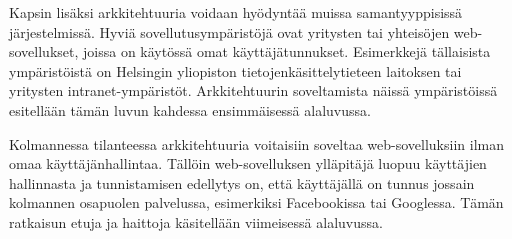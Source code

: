 Kapsin lisäksi arkkitehtuuria voidaan hyödyntää muissa samantyyppisissä järjestelmissä. Hyviä sovellutusympäristöjä ovat yritysten tai yhteisöjen web-sovellukset, joissa on käytössä omat käyttäjätunnukset. Esimerkkejä tällaisista ympäristöistä on Helsingin yliopiston tietojenkäsittelytieteen laitoksen tai yritysten intranet-ympä\-ris\-töt. Arkkitehtuurin soveltamista näissä ympäristöissä esitellään tämän luvun kahdessa ensimmäisessä alaluvussa.

Kolmannessa tilanteessa arkkitehtuuria voitaisiin soveltaa web-sovelluksiin ilman omaa käyttäjänhallintaa. Tällöin web-sovelluksen ylläpitäjä luopuu käyttäjien hallinnasta ja tunnistamisen edellytys on, että käyttäjällä on tunnus jossain kolmannen osapuolen palvelussa, esimerkiksi Facebookissa tai Googlessa. Tämän ratkaisun etuja ja haittoja käsitellään viimeisessä alaluvussa.